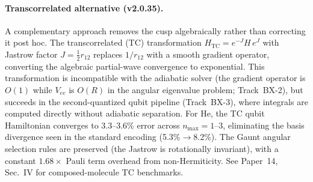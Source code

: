 \documentclass[aps,pra,twocolumn,superscriptaddress,longbibliography]{revtex4-2}
\begin{document}
\paragraph{Transcorrelated alternative (v2.0.35).}
A complementary approach removes the cusp algebraically rather than
correcting it post hoc.  The transcorrelated (TC) transformation
$H_{\mathrm{TC}} = e^{-J} H\, e^{J}$ with Jastrow factor
$J = \tfrac{1}{2} r_{12}$ replaces $1/r_{12}$ with a smooth
gradient operator, converting the algebraic partial-wave convergence
to exponential.  This transformation is incompatible with the
adiabatic solver (the gradient operator is $O(1)$ while $V_{ee}$ is
$O(R)$ in the angular eigenvalue problem; Track~BX-2), but succeeds
in the second-quantized qubit pipeline (Track~BX-3), where integrals
are computed directly without adiabatic separation.  For He, the TC
qubit Hamiltonian converges to 3.3--3.6\% error across
$n_{\max} = 1$--$3$, eliminating the basis divergence seen in the
standard encoding (5.3\%$\to$8.2\%).  The Gaunt angular selection
rules are preserved (the Jastrow is rotationally invariant), with
a constant $1.68\times$ Pauli term overhead from non-Hermiticity.
See Paper~14, Sec.~IV for composed-molecule TC benchmarks.
\end{document}
